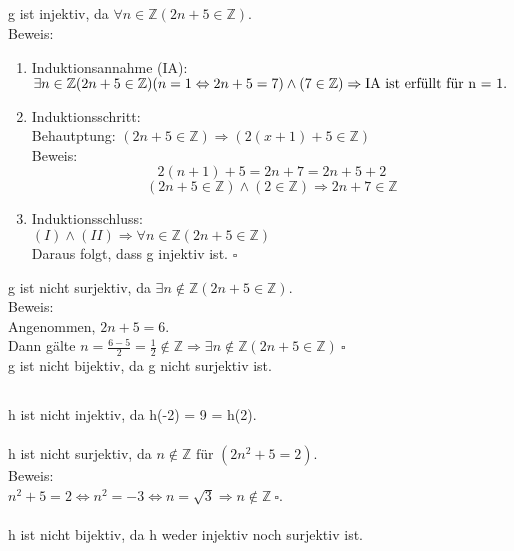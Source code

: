 \documentclass[fleqn]{article}
\newcommand{\Z}{\mathbb{Z}}
\begin{document}
\subsection{}
g ist injektiv, da $\forall n \in \Z (2n + 5 \in \Z)$.\\
Beweis:\\
\begin{enumerate}[I]
    \item Induktionsannahme (IA): $\exists n \in \Z (2n + 5 \in \Z)\\
        (n=1 \Leftrightarrow 2n + 5 = 7) \wedge (7 \in \Z) \Rightarrow \text{IA ist erfüllt für n = 1.}$
    \item Induktionsschritt:\\
        Behautptung: $(2n + 5 \in \Z) \Rightarrow (2(x+1) + 5 \in \Z)$\\
        Beweis:
        \[
            2(n+1) + 5 = 2n +7 = 2n + 5 + 2
        \]\[
            (2n + 5 \in \Z) \wedge (2 \in \Z) \Rightarrow 2n + 7 \in \Z
        \]
    \item Induktionsschluss:\\
        $(I) \wedge (II) \Rightarrow \forall n \in \Z (2n + 5 \in \Z)$\\
        Daraus folgt, dass g injektiv ist. $\square$
\end{enumerate}
g ist nicht surjektiv, da $\exists n \notin \Z (2n + 5 \in \Z)$.\\
Beweis:\\
Angenommen, $2n + 5 = 6$.\\
Dann gälte $n = \frac{6-5}{2} = \frac{1}{2} \notin \Z \Rightarrow \exists n \notin \Z (2n + 5 \in \Z)~ \square$
\\
g ist nicht bijektiv, da g nicht surjektiv ist.
\subsection{}
h ist nicht injektiv, da h(-2) = 9 = h(2).\\
\\
h ist nicht surjektiv, da $n \notin \Z \text{ für } (2n^2 + 5 = 2)$.\\
Beweis:\\
$n^2 + 5 = 2 \Leftrightarrow n^2 = -3 \Leftrightarrow n = \sqrt{3} \Rightarrow n \notin \Z~\square$.\\
\\
h ist nicht bijektiv, da h weder injektiv noch surjektiv ist.
\section{}
\end{document}
